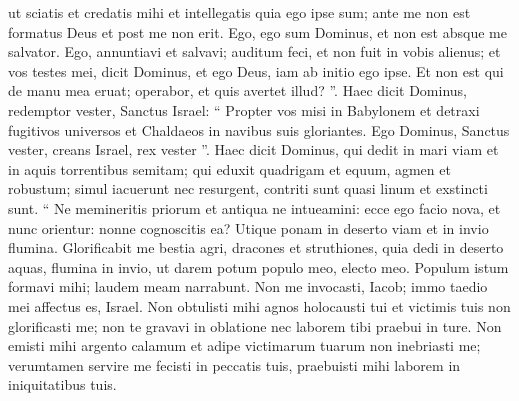 \begin{biblechapter}
\begin{biblechapter}
\begin{biblechapter}
\begin{biblechapter}
\begin{biblechapter}
\begin{biblechapter}
\begin{biblechapter}
\begin{biblechapter}
\begin{biblechapter}
\begin{biblechapter}
\begin{biblechapter}
\begin{biblechapter}
\begin{biblechapter}
\begin{biblechapter}
\begin{biblechapter}
\begin{biblechapter}
\begin{biblechapter}
\begin{biblechapter}
\begin{biblechapter}
\begin{biblechapter}
\begin{biblechapter}
\begin{biblechapter}
\begin{biblechapter}
\begin{biblechapter}
\begin{biblechapter}
\begin{biblechapter}
\begin{biblechapter}
\begin{biblechapter}
\begin{biblechapter}
\begin{biblechapter}
\begin{biblechapter}
\begin{biblechapter}
\begin{biblechapter}
\begin{biblechapter}
\begin{biblechapter}
\begin{biblechapter}
\begin{biblechapter}
\begin{biblechapter}
\begin{biblechapter}
\begin{biblechapter}
\begin{biblechapter}
\begin{biblechapter}
\begin{biblechapter}
 ut sciatis et credatis mihi
 et intellegatis quia ego ipse sum;
 ante me non est formatus Deus
 et post me non erit.
 \verse Ego, ego sum Dominus,
 et non est absque me salvator.
 \verse Ego, annuntiavi et salvavi;
 auditum feci, et non fuit in vobis alienus;
 et vos testes mei, dicit Dominus,
 et ego Deus,
 \verse iam ab initio ego ipse.
 Et non est qui de manu mea eruat; operabor, et quis avertet illud? ”. 
\verse Haec dicit Dominus, redemptor vester,
 Sanctus Israel:
 “ Propter vos misi in Babylonem
 et detraxi fugitivos universos
 et Chaldaeos in navibus suis gloriantes.
 \verse Ego Dominus, Sanctus vester,
 creans Israel, rex vester ”.
 \verse Haec dicit Dominus,
 qui dedit in mari viam
 et in aquis torrentibus semitam;
 \verse qui eduxit quadrigam et equum,
 agmen et robustum;
 simul iacuerunt nec resurgent,
 contriti sunt quasi linum et exstincti sunt.
 \verse “ Ne memineritis priorum
 et antiqua ne intueamini:
 \verse ecce ego facio nova,
 et nunc orientur: nonne cognoscitis ea?
 Utique ponam in deserto viam
 et in invio flumina.
 \verse Glorificabit me bestia agri,
 dracones et struthiones,
 quia dedi in deserto aquas,
 flumina in invio,
 ut darem potum populo meo, electo meo.
 \verse Populum istum formavi mihi;
 laudem meam narrabunt.
 \verse Non me invocasti, Iacob;
 immo taedio mei affectus es, Israel.
 \verse Non obtulisti mihi agnos holocausti tui
 et victimis tuis non glorificasti me;
 non te gravavi in oblatione
 nec laborem tibi praebui in ture.
 \verse Non emisti mihi argento calamum
 et adipe victimarum tuarum non inebriasti me;
 verumtamen servire me fecisti in peccatis tuis,
 praebuisti mihi laborem in iniquitatibus tuis.

\end{biblechapter}
\end{biblechapter}
\end{biblechapter}
\end{biblechapter}
\end{biblechapter}
\end{biblechapter}
\end{biblechapter}
\end{biblechapter}
\end{biblechapter}
\end{biblechapter}
\end{biblechapter}
\end{biblechapter}
\end{biblechapter}
\end{biblechapter}
\end{biblechapter}
\end{biblechapter}
\end{biblechapter}
\end{biblechapter}
\end{biblechapter}
\end{biblechapter}
\end{biblechapter}
\end{biblechapter}
\end{biblechapter}
\end{biblechapter}
\end{biblechapter}
\end{biblechapter}
\end{biblechapter}
\end{biblechapter}
\end{biblechapter}
\end{biblechapter}
\end{biblechapter}
\end{biblechapter}
\end{biblechapter}
\end{biblechapter}
\end{biblechapter}
\end{biblechapter}
\end{biblechapter}
\end{biblechapter}
\end{biblechapter}
\end{biblechapter}
\end{biblechapter}
\end{biblechapter}
\end{biblechapter}
